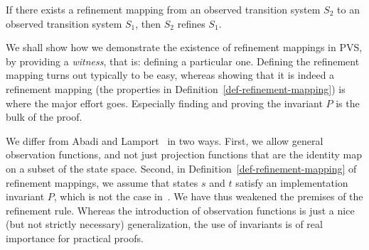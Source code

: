 \begin{theorem}
\label{theorem-refinement}
If there exists a refinement mapping from an observed transition system $S_2$
to an observed transition system $S_1$, then $S_2$ refines $S_1$. 

\end{theorem}

We shall show how we demonstrate the  existence of refinement mappings
in PVS,  by providing a {\em witness},  that is: defining a particular
one. Defining the refinement mapping  turns out typically to be  easy,
whereas showing that it is indeed a refinement mapping (the properties
in Definition~\ref{def-refinement-mapping}) is  where the  major  effort
goes.  Especially finding and proving the invariant $P$ is the bulk of
the proof.

We   differ from Abadi  and Lamport~\cite{AL:Mappings} in two
ways.  First, we allow general  observation functions, and not
just projection functions that are the identity map on a subset of   the
state space.   Second, in Definition~\ref{def-refinement-mapping} of
refinement mappings,  we  assume that states  $s$  and $t$  satisfy an
implementation     invariant  $P$,   which    is   not   the  case
in~\cite{AL:Mappings}\@.   We have thus weakened the premises of
the refinement rule.  Whereas the introduction of observation functions
is just a nice (but not   strictly   necessary) generalization,
the use of invariants is of real importance for practical proofs.








